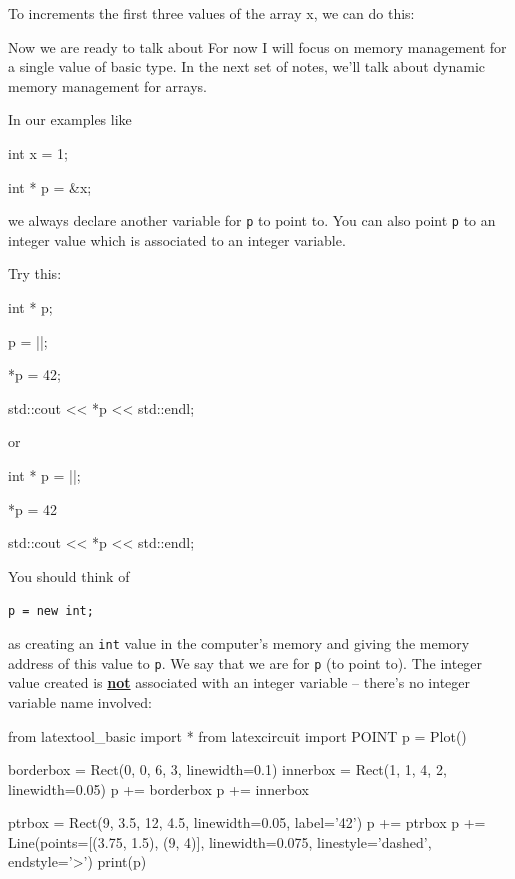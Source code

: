 To increments the first three values of the array x, we can do this:

\begin{consolethree}[escapeinside=||]
int index = 0;

int x[] = {3, 5, 7, 9, 2);

inc(inc(inc(&index, x), x), x); 
\end{consolethree}
\newpage{}

Now we are ready to talk about  For now I will focus on memory management for a single value of basic type. In the next set of notes, we'll talk about dynamic memory management for arrays.

In our examples like

\begin{consolethree}[escapeinside=||]
int x = 1;

int * p = &x;
\end{consolethree}

we always declare another variable for \texttt{p} to point to. You can also point \texttt{p} to an integer value which is  associated to an integer variable.

Try this:

\begin{consolethree}[escapeinside=||]
int * p;

p = ||;

*p = 42;

std::cout << *p << std::endl;
\end{consolethree}
or

\begin{consolethree}[escapeinside=||]
int * p = ||;

*p = 42

std::cout << *p << std::endl;
\end{consolethree}
You should think of
\begin{center}
\texttt{p = new int;}
\end{center}
as creating an \texttt{int} value  in the computer's memory and giving the memory address of this value to \texttt{p}. We say that we are  for \texttt{p} (to point to). The integer value created is \underline{\textbf{not}} associated with an integer variable -- there's no integer variable name involved:

\begin{python}
from latextool_basic import *
from latexcircuit import POINT
p = Plot()

borderbox = Rect(0, 0, 6, 3, linewidth=0.1)
innerbox = Rect(1, 1, 4, 2, linewidth=0.05)
p += borderbox
p += innerbox

ptrbox = Rect(9, 3.5, 12, 4.5, linewidth=0.05, label='42')
p += ptrbox
p += Line(points=[(3.75, 1.5), (9, 4)], linewidth=0.075, linestyle='dashed', endstyle='>')
print(p)
\end{python}

